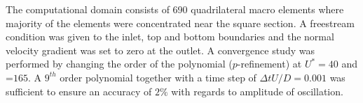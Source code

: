  The computational domain consists of 690 quadrilateral macro elements where majority of the elements were concentrated near the square section. A freestream condition was given to the inlet, top and bottom boundaries and the normal velocity gradient was set to zero at the outlet. A convergence study was performed by changing the order of the polynomial ($p$-refinement) at $U^*=40$ and \reynoldsnumber=$165$. A $9^{th}$ order polynomial together with a time step of $\Delta tU/D=0.001$ was sufficient to ensure an accuracy of $2\%$ with regards to amplitude of oscillation.
